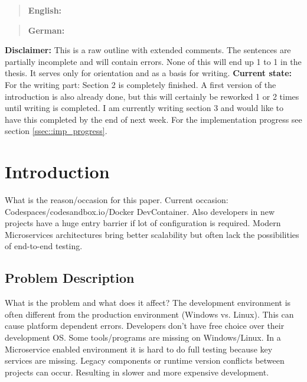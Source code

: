 \documentclass[12pt, a4paper]{article}
\begin{document}


\maketitle
\begin{abstract}
    \textbf{English:} \lipsum[20]
\end{abstract}
\begin{abstract}
    \textbf{German:} \lipsum[20]
\end{abstract}
\newpage

\noindent\textbf{Disclaimer:}\newline
This is a raw outline with extended comments. The sentences are partially incomplete and will contain errors. None of this will end up 1 to 1 in the thesis. It serves only for orientation and as a basis for writing.\newline
\noindent\textbf{Current state:}\newline
For the writing part: Section 2 is completely finished. A first version of the introduction is also already done, but this will certainly be reworked 1 or 2 times until writing is completed.
I am currently writing section 3 and would like to have this completed by the end of next week. For the implementation progress see section \ref{ssec::imp_progress}.


\setcounter{lastroman}{\value{page}}

\section{Introduction}\label{sec::intro}
    What is the reason/occasion for this paper.\newline
    Current occasion: Codespaces/codesandbox.io/Docker DevContainer. Also developers in new projects have a huge entry barrier if lot of configuration is required. Modern Microservices architectures bring better scalability but often lack the possibilities of end-to-end testing.
    \subsection{Problem Description}
    What is the problem and what does it affect?\newline
    The development environment is often different from the production environment (Windows vs. Linux). This can cause platform dependent errors. Developers don't have free choice over their development OS. Some tools/programs are missing on Windows/Linux. In a Microservice enabled environment it is hard to do full testing because key services are missing. Legacy components or runtime version conflicts between projects can occur. Resulting in slower and more expensive development.
\end{document}
